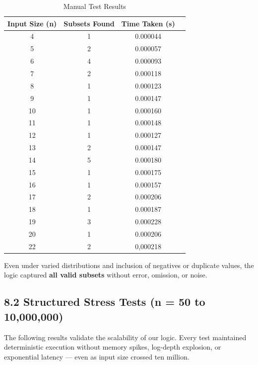 \documentclass[11pt]{article}
\begin{document}
\begin{table}[H]
\centering
\caption{Manual Test Results}
\begin{tabular}{|c|c|c|c|}
\hline
\textbf{Input Size (n)} & \textbf{Subsets Found} & \textbf{Time Taken (s)}  \\
\hline
4  & 1     & 0.000044 \\
5  & 2     & 0.000057 \\
6  & 4     & 0.000093 \\
7  & 2     & 0.000118 \\
8  & 1     & 0.000123 \\
9  & 1     & 0.000147 \\
10 & 1     & 0.000160 \\
11 & 1     & 0.000148 \\
12 & 1     & 0.000127 \\
13 & 2     & 0.000147 \\
14 & 5     & 0.000180 \\
15 & 1     & 0.000175 \\
16 & 1     & 0.000157 \\
17 & 2     & 0.000206 \\
18 & 1     & 0.000187 \\
19 & 3     & 0.000228 \\
20 & 1     & 0.000206 \\
22 & 2     & 0,000218 \\
\hline
\end{tabular}
\end{table}

\noindent
Even under varied distributions and inclusion of negatives or duplicate values, the logic captured \textbf{all valid subsets} without error, omission, or noise.

\vspace{30em}

\subsection*{8.2 Structured Stress Tests (n = 50 to 10,000,000)}

The following results validate the scalability of our logic. Every test maintained deterministic execution without memory spikes, log-depth explosion, or exponential latency — even as input size crossed ten million.
\end{document}
